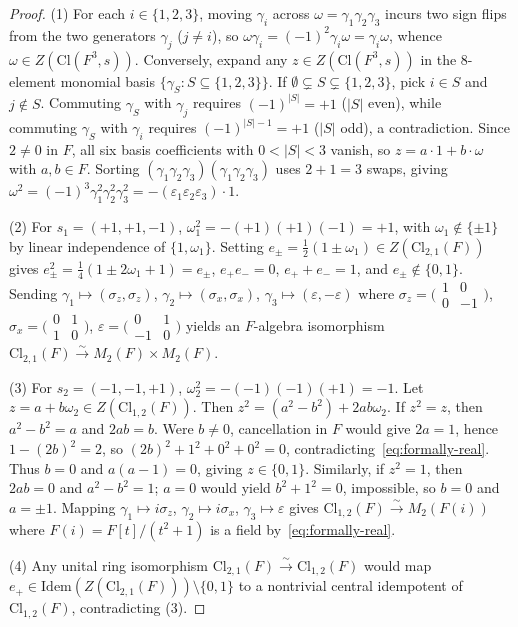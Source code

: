 \documentclass[11pt]{article}
\theoremstyle{definition}
\newcommand{\Cl}{\mathrm{Cl}}
\newcommand{\Idem}{\mathrm{Idem}}
\begin{document}
\begin{proof}
(1) For each $i \in \{1, 2, 3\}$, moving $\gamma_i$ across $\omega = \gamma_1 \gamma_2 \gamma_3$ incurs two sign flips from the two generators $\gamma_j$ ($j \neq i$), so $\omega \gamma_i = (-1)^2 \gamma_i \omega = \gamma_i \omega$, whence $\omega \in Z(\Cl(F^3, s))$. Conversely, expand any $z \in Z(\Cl(F^3, s))$ in the $8$-element monomial basis $\{\gamma_S : S \subseteq \{1, 2, 3\}\}$. If $\emptyset \subsetneq S \subsetneq \{1, 2, 3\}$, pick $i \in S$ and $j \notin S$. Commuting $\gamma_S$ with $\gamma_j$ requires $(-1)^{|S|} = +1$ ($|S|$ even), while commuting $\gamma_S$ with $\gamma_i$ requires $(-1)^{|S|-1} = +1$ ($|S|$ odd), a contradiction. Since $2 \neq 0$ in $F$, all six basis coefficients with $0 < |S| < 3$ vanish, so $z = a\cdot 1 + b\cdot \omega$ with $a, b \in F$. Sorting $(\gamma_1 \gamma_2 \gamma_3)(\gamma_1 \gamma_2 \gamma_3)$ uses $2 + 1 = 3$ swaps, giving $\omega^2 = (-1)^3 \gamma_1^2 \gamma_2^2 \gamma_3^2 = -(\varepsilon_1 \varepsilon_2 \varepsilon_3)\cdot 1$.

(2) For $s_1 = (+1, +1, -1)$, $\omega_1^2 = -(+1)(+1)(-1) = +1$, with $\omega_1 \notin \{\pm 1\}$ by linear independence of $\{1, \omega_1\}$. Setting $e_\pm = \frac{1}{2}(1 \pm \omega_1) \in Z(\Cl_{2,1}(F))$ gives $e_\pm^2 = \frac{1}{4}(1 \pm 2\omega_1 + 1) = e_\pm$, $e_+ e_- = 0$, $e_+ + e_- = 1$, and $e_\pm \notin \{0, 1\}$. Sending $\gamma_1 \mapsto (\sigma_z, \sigma_z)$, $\gamma_2 \mapsto (\sigma_x, \sigma_x)$, $\gamma_3 \mapsto (\varepsilon, -\varepsilon)$ where $\sigma_z = \bigl(\begin{smallmatrix}1&0\\0&-1\end{smallmatrix}\bigr)$, $\sigma_x = \bigl(\begin{smallmatrix}0&1\\1&0\end{smallmatrix}\bigr)$, $\varepsilon = \bigl(\begin{smallmatrix}0&1\\-1&0\end{smallmatrix}\bigr)$ yields an $F$-algebra isomorphism $\Cl_{2,1}(F) \xrightarrow{\sim} M_2(F) \times M_2(F)$.

(3) For $s_2 = (-1, -1, +1)$, $\omega_2^2 = -(-1)(-1)(+1) = -1$. Let $z = a + b\omega_2 \in Z(\Cl_{1,2}(F))$. Then $z^2 = (a^2 - b^2) + 2ab\omega_2$.
If $z^2 = z$, then $a^2 - b^2 = a$ and $2ab = b$. Were $b \neq 0$, cancellation in $F$ would give $2a = 1$, hence $1 - (2b)^2 = 2$, so $(2b)^2 + 1^2 + 0^2 + 0^2 = 0$, contradicting~\eqref{eq:formally-real}. Thus $b = 0$ and $a(a - 1) = 0$, giving $z \in \{0, 1\}$. Similarly, if $z^2 = 1$, then $2ab = 0$ and $a^2 - b^2 = 1$; $a = 0$ would yield $b^2 + 1^2 = 0$, impossible, so $b = 0$ and $a = \pm 1$. Mapping $\gamma_1 \mapsto i\sigma_z$, $\gamma_2 \mapsto i\sigma_x$, $\gamma_3 \mapsto \varepsilon$ gives $\Cl_{1,2}(F) \xrightarrow{\sim} M_2(F(i))$ where $F(i) = F[t]/(t^2+1)$ is a field by~\eqref{eq:formally-real}.

(4) Any unital ring isomorphism $\Cl_{2,1}(F) \xrightarrow{\sim} \Cl_{1,2}(F)$ would map $e_+ \in \Idem(Z(\Cl_{2,1}(F))) \setminus \{0, 1\}$ to a nontrivial central idempotent of $\Cl_{1,2}(F)$, contradicting (3).
\end{proof}
\end{document}
